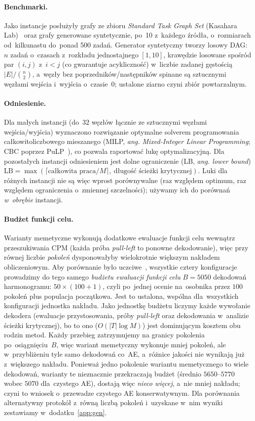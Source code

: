 \documentclass[pdflatex,sn-mathphys,Numbered]{sn-jnl}
\begin{document}
\paragraph{Benchmarki.}
Jako instancje posłużyły grafy ze zbioru \textit{Standard Task Graph Set}
(Kasahara Lab)~\cite{tobita2002} oraz grafy generowane syntetycznie, po~10
z~każdego źródła, o~rozmiarach od~kilkunastu do~ponad 500 zadań. Generator
syntetyczny tworzy losowy DAG: $n$ zadań o~czasach z~rozkładu jednostajnego
$[1,10]$, krawędzie losowane spośród par $(i,j)$ z~$i<j$ (co gwarantuje
acykliczność) w~liczbie zadanej gęstością $|E|/\binom{n}{2}$, a~węzły bez
poprzedników/następników spinane są sztucznymi węzłami wejścia i~wyjścia
o~czasie~$0$; ustalone ziarno czyni zbiór powtarzalnym.

\paragraph{Odniesienie.}
Dla małych instancji (do~$32$ węzłów łącznie ze sztucznymi węzłami
wejścia/wyjścia) wyznaczono rozwiązanie optymalne solverem programowania
całkowitoliczbowego mieszanego (MILP, \textit{ang. Mixed-Integer Linear
Programming}; CBC poprzez PuLP~\cite{mitchell2011}), co pozwala raportować lukę
optymalizacyjną. Dla pozostałych instancji odniesieniem jest dolne ograniczenie
(LB, \textit{ang. lower bound})
$\mathrm{LB} = \max(\lceil \text{całkowita praca}/M \rceil,\ \text{długość ścieżki krytycznej})$.
Luki dla różnych instancji nie są więc wprost porównywalne (raz względem optimum,
raz względem ograniczenia o~zmiennej szczelności); używamy ich do porównań
\emph{w~obrębie} instancji.

\paragraph{Budżet funkcji celu.}
Warianty memetyczne wykonują dodatkowe ewaluacje funkcji celu wewnątrz
przeszukiwania CPM (każda próba \textit{pull-left} to ponowne dekodowanie), więc
przy równej liczbie \emph{pokoleń} dysponowałyby wielokrotnie większym nakładem
obliczeniowym. Aby porównanie było uczciwe~\cite{hooker1995}, wszystkie cztery
konfiguracje prowadzimy do tego samego \emph{budżetu ewaluacji funkcji celu}
$B = 5050$ dekodowań harmonogramu: $50\times(100+1)$, czyli po~jednej ocenie
na~osobnika przez $100$ pokoleń plus populacja początkowa. Jest to ustalona,
wspólna dla~wszystkich konfiguracji jednostka nakładu. Jako jednostkę budżetu liczymy każde
wywołanie dekodera (ewaluacje przystosowania, próby \textit{pull-left} oraz
dekodowania w~analizie ścieżki krytycznej), bo to ono ($O(|T|\log M)$)
jest dominującym kosztem obu rodzin metod. Każdy przebieg zatrzymujemy na granicy
pokolenia po~osiągnięciu~$B$, więc wariant memetyczny wykonuje mniej pokoleń, ale
w~przybliżeniu tyle samo dekodowań co~AE, a~różnice jakości nie wynikają już
z~większego nakładu. Ponieważ jedno pokolenie wariantu memetycznego to wiele
dekodowań, warianty te nieznacznie przekraczają budżet (średnio $5650$--$5770$
wobec $5070$ dla~czystego AE), dostają więc \emph{nieco więcej}, a~nie mniej
nakładu; czyni to wniosek o~przewadze czystego AE konserwatywnym. Dla porównania
alternatywny protokół z~równą liczbą pokoleń i~uzyskane w~nim wyniki zestawiamy
w~dodatku~\ref{app:gen}.
\end{document}
